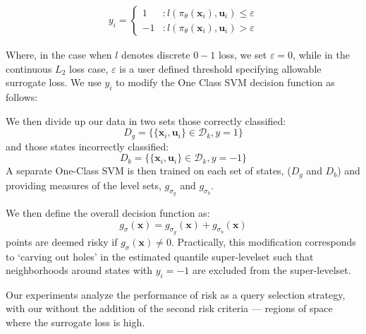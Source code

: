 \documentclass[10pt, conference]{ieeeconf}      %
\newcommand{\bu}{\mathbf{u}}
\newcommand{\bx}{\mathbf{x}}
\newcommand{\acro}{SHIV}
\begin{document}
\begin{align}
y_i = \left\{
     \begin{array}{lr}
         1 & : l(\pi_{\theta}(\bx_i),\bu_i)\le \varepsilon\\
         -1 & : l(\pi_{\theta}(\bx_i),\bu_i)>\varepsilon
     \end{array}
   \right.
\end{align}

Where, in the case when $l$ denotes discrete $0-1$ loss, we set $\varepsilon = 0$, while in the continuous $L_2$ loss
case, $\varepsilon$ is a user defined threshold specifying allowable surrogate loss.
We use $y_i$ to modify the One Class SVM decision function as follows: 


We then divide up our data in two sets those correctly classified:
$$D_{g}=\{\lbrace \bx_i,\bu_i \rbrace \in \mathcal{D}_{k}, y=1\}$$
and those states incorrectly classified: 
$$D_{b}=\{\lbrace \bx_i,\bu_i \rbrace \in \mathcal{D}_{k}, y=-1\}$$
A separate One-Class SVM is then trained on each set of states, ($D_{g}$ and $D_{b}$) and providing measures of the level sets, $g_{\sigma_g}$ and $g_{\sigma_b}$. 

We then define the overall decision function as:
$$g_{\sigma}(\bx) = g_{\sigma_g} (\bx)+ g_{\sigma_b}(\bx)$$
points are deemed risky if $g_{\sigma}(\bx) \neq 0$.  Practically, this modification corresponds to
`carving out holes' in the estimated quantile super-levelset such that neighborhoods around states with $y_i=-1$ are
excluded from the super-levelset.

Our experiments analyze the performance of risk as a query selection strategy, with our without the addition of the second risk criteria --- regions of space where the surrogate loss is high.


\end{document}

